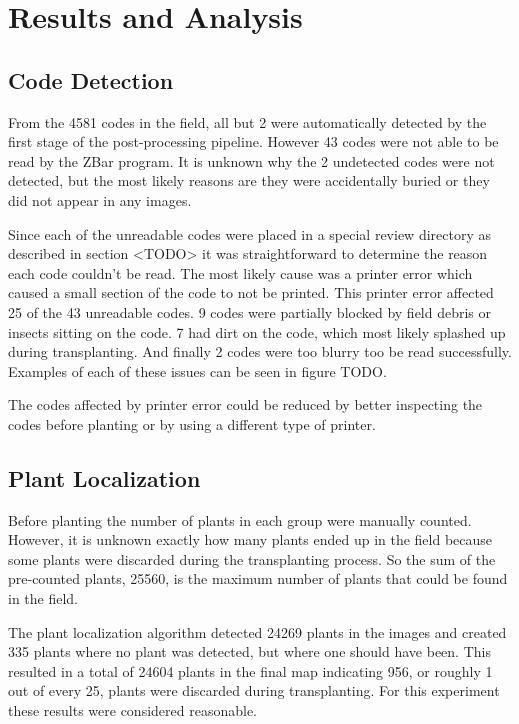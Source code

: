 
\cleardoublepage

\chapter{Results and Analysis}
\label{processing}

\section{Code Detection}

From the 4581 codes in the field, all but 2 were automatically detected by the first stage of the post-processing pipeline.  However 43 codes were not able to be read by the ZBar program.  It is unknown why the 2 undetected codes were not detected, but the most likely reasons are they were accidentally buried or they did not appear in any images.  

Since each of the unreadable codes were placed in a special review directory as described in section <TODO> it was straightforward to determine the reason each code couldn't be read.  The most likely cause was a printer error which caused a small section of the code to not be printed.  This printer error affected 25 of the 43 unreadable codes.  9 codes were partially blocked by field debris or insects sitting on the code.  7 had dirt on the code, which most likely splashed up during transplanting. And finally 2 codes were too blurry too be read successfully.  Examples of each of these issues can be seen in figure TODO. 

The codes affected by printer error could be reduced by better inspecting the codes before planting or by using a different type of printer.


\section{Plant Localization}

Before planting the number of plants in each group were manually counted. However, it is unknown exactly how many plants ended up in the field because some plants were discarded during the transplanting process.  So the sum of the pre-counted plants, 25560, is the maximum number of plants that could be found in the field.  

The plant localization algorithm detected 24269 plants in the images and created 335 plants where no plant was detected, but where one should have been.  This resulted in a total of 24604 plants in the final map indicating 956, or roughly 1 out of every 25, plants were discarded during transplanting.  For this experiment these results were considered reasonable. 

